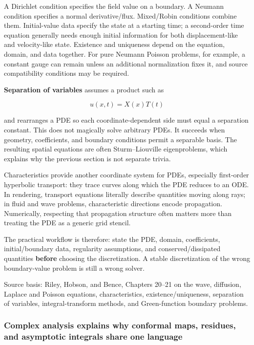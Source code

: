 A Dirichlet condition specifies the field value on a boundary. A Neumann condition specifies a normal derivative/flux. Mixed/Robin conditions combine them. Initial-value data specify the state at a starting time; a second-order time equation generally needs enough initial information for both displacement-like and velocity-like state. Existence and uniqueness depend on the equation, domain, and data together. For pure Neumann Poisson problems, for example, a constant gauge can remain unless an additional normalization fixes it, and source compatibility conditions may be required.

\textbf{Separation of variables} assumes a product such as

\[
u(x,t)=X(x)T(t)
\]

and rearranges a PDE so each coordinate-dependent side must equal a separation constant. This does not magically solve arbitrary PDEs. It succeeds when geometry, coefficients, and boundary conditions permit a separable basis. The resulting spatial equations are often Sturm--Liouville eigenproblems, which explains why the previous section is not separate trivia.

Characteristics provide another coordinate system for PDEs, especially first-order hyperbolic transport: they trace curves along which the PDE reduces to an ODE. In rendering, transport equations literally describe quantities moving along rays; in fluid and wave problems, characteristic directions encode propagation. Numerically, respecting that propagation structure often matters more than treating the PDE as a generic grid stencil.

The practical workflow is therefore: state the PDE, domain, coefficients, initial/boundary data, regularity assumptions, and conserved/dissipated quantities \textbf{before} choosing the discretization. A stable discretization of the wrong boundary-value problem is still a wrong solver.

Source basis: Riley, Hobson, and Bence, Chapters 20--21 on the wave, diffusion, Laplace and Poisson equations, characteristics, existence/uniqueness, separation of variables, integral-transform methods, and Green-function boundary problems.

\subsubsection{Complex analysis explains why conformal maps, residues, and asymptotic integrals share one language}\label{02-foundations-ii-ch025-complex-analysis-explains-why-conformal-maps-residues-and-asymptotic-integrals-share-one-language}

